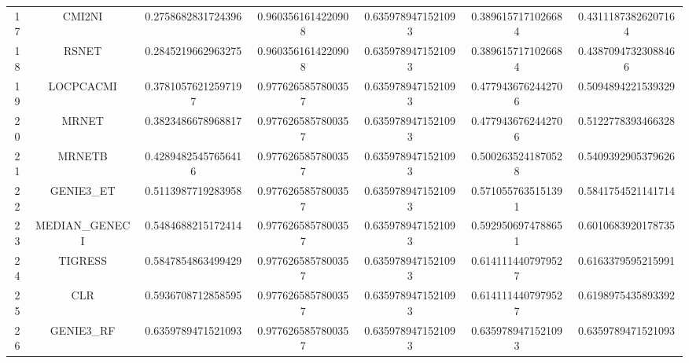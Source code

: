 \documentclass[a4paper,10pt]{article}
\begin{document}
\begin{landscape}
\begin{table}[!htp]
\begin{tabular}{ccccccc}
17&CMI2NI&0.2758682831724396&0.9603561614220908&0.6359789471521093&0.3896157171026684&0.43111873826207164\\
18&RSNET&0.2845219662963275&0.9603561614220908&0.6359789471521093&0.3896157171026684&0.43870947323088466\\
19&LOCPCACMI&0.37810576212597197&0.9776265857800357&0.6359789471521093&0.4779436762442706&0.5094894221539329\\
20&MRNET&0.3823486678968817&0.9776265857800357&0.6359789471521093&0.4779436762442706&0.5122778393466328\\
21&MRNETB&0.42894825457656416&0.9776265857800357&0.6359789471521093&0.5002635241870528&0.5409392905379626\\
22&GENIE3_ET&0.5113987719283958&0.9776265857800357&0.6359789471521093&0.5710557635151391&0.5841754521141714\\
23&MEDIAN_GENECI&0.5484688215172414&0.9776265857800357&0.6359789471521093&0.5929506974788651&0.6010683920178735\\
24&TIGRESS&0.5847854863499429&0.9776265857800357&0.6359789471521093&0.6141114407979527&0.6163379595215991\\
25&CLR&0.5936708712858595&0.9776265857800357&0.6359789471521093&0.6141114407979527&0.6198975435893392\\
26&GENIE3_RF&0.6359789471521093&0.9776265857800357&0.6359789471521093&0.6359789471521093&0.6359789471521093\\
\hline
\end{tabular}
\end{table}

\end{landscape}
\end{document}
